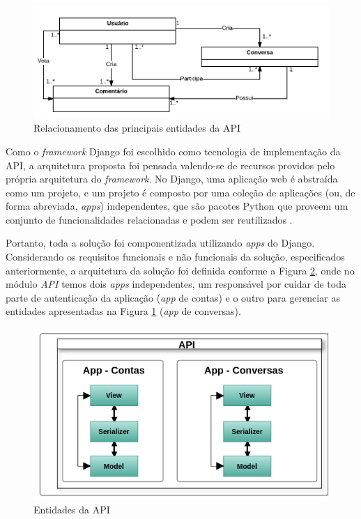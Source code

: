 \begin{figure}[h!]
\centering
\includegraphics[scale=0.5]{figuras/entidades.png}
\caption{Relacionamento das principais entidades da API}
\label{fig:entidades}
\end{figure}

Como o \textit{framework} Django foi escolhido como tecnologia de implementação da API, a arquitetura proposta foi pensada valendo-se de 
recursos providos pelo própria arquitetura do \textit{framework}.
No Django, uma aplicação web é abstraída como um projeto, e um projeto é composto por uma coleção de aplicações
(ou, de forma abreviada, \textit{apps}) independentes, que
são pacotes Python que proveem um conjunto de funcionalidades relacionadas e podem ser reutilizados \cite{django_apps}.

Portanto, toda a solução foi componentizada utilizando \textit{apps} do 
Django. Considerando os requisitos funcionais e não funcionais da solução, especificados anteriormente, a arquitetura da solução foi definida 
conforme a Figura \ref{fig:arquitetura_api}, onde no módulo \textit{API} temos dois \textit{apps} independentes, um responsável
por cuidar de toda parte de autenticação da aplicação (\textit{app} de contas) e o outro para gerenciar as entidades apresentadas na
Figura \ref{fig:entidades} (\textit{app} de conversas). 

\begin{figure}[h!]
\centering
\includegraphics[scale=0.8]{figuras/arquitetura_api.png}
\caption{Entidades da API}
\label{fig:arquitetura_api}
\end{figure}

